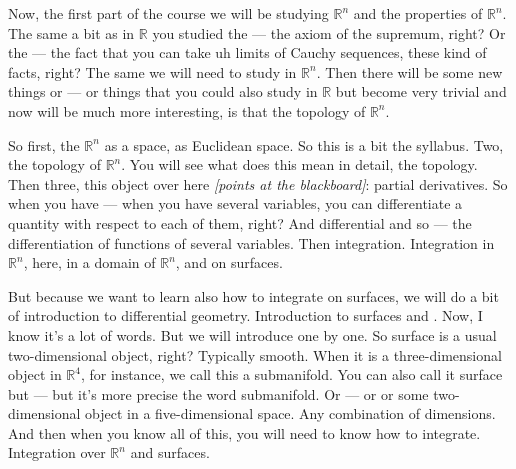 % 

\begin{spoken-clean}[00:11:00 - 00:12:30]
Now, the first part of the course we will be studying $\mathbb{R}^n$ and the properties of $\mathbb{R}^n$. The same a bit as in $\mathbb{R}$ you studied the --- the axiom of the supremum, right? Or the --- the fact that you can take uh limits of Cauchy sequences, these kind of facts, right? The same we will need to study in $\mathbb{R}^n$. Then there will be some new things or --- or things that you could also study in $\mathbb{R}$ but become very trivial and now will be much more interesting, is that the topology of $\mathbb{R}^n$. 

So first, the $\mathbb{R}^n$ as a space, as Euclidean space. So this is a bit the syllabus. Two, the topology of $\mathbb{R}^n$. You will see what does this mean in detail, the topology. Then three, this object over here \textit{[points at the blackboard]}: partial derivatives. So when you have --- when you have several variables, you can differentiate a quantity with respect to each of them, right? And differential and so --- the differentiation of functions of several variables. Then integration. Integration in $\mathbb{R}^n$, here, in a domain of $\mathbb{R}^n$, and on surfaces. 

But because we want to learn also how to integrate on surfaces, we will do a bit of introduction to differential geometry. Introduction to surfaces and . Now, I know it's a lot of words. But we will introduce one by one. So surface is a usual two-dimensional object, right? Typically smooth. When it is a three-dimensional object in $\mathbb{R}^4$, for instance, we call this a submanifold. You can also call it surface but --- but it's more precise the word submanifold. Or --- or or some two-dimensional object in a five-dimensional space. Any combination of dimensions. And then when you know all of this, you will need to know how to integrate. Integration over $\mathbb{R}^n$ and surfaces.
\end{spoken-clean}

